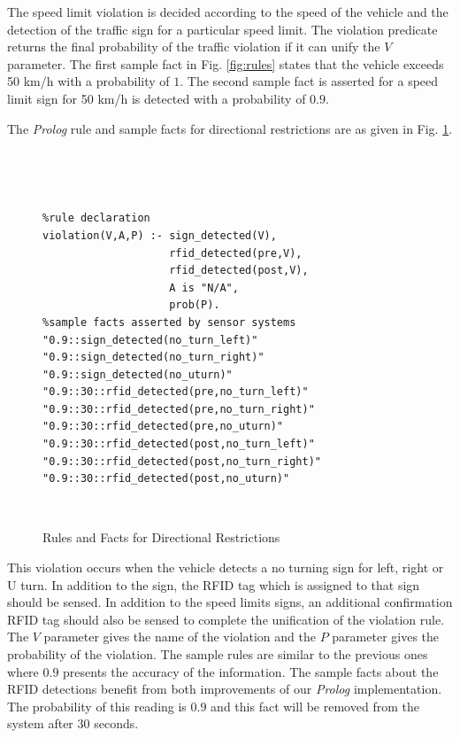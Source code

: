 \documentclass[letterpaper, 10 pt, conference]{ieeeconf}
\newenvironment{mylisting}
{~\par~\begin{list}{}{\setlength{\leftmargin}{1em}}\item\scriptsize\bfseries}
{\end{list}~\par}
\begin{document}
The speed limit violation is decided according to the speed of the vehicle and the detection of the traffic sign for a particular speed limit. The violation predicate returns the final probability of the traffic violation if it can unify the $V$ parameter. The first sample fact in Fig. \ref{fig:rules}  states that the vehicle exceeds 50 km/h with a probability of $1$. The second sample fact is asserted for a speed limit sign for 50 km/h is detected with a probability of $0.9$.

The \textit{Prolog} rule and sample facts for directional restrictions are as given in Fig. \ref{fig:directional}.

\begin{figure}[thb]
      \centering
\begin{mylisting}

\begin{verbatim}
%rule declaration
violation(V,A,P) :- sign_detected(V),
                    rfid_detected(pre,V),
                    rfid_detected(post,V),
                    A is "N/A",
                    prob(P).
%sample facts asserted by sensor systems
"0.9::sign_detected(no_turn_left)"
"0.9::sign_detected(no_turn_right)"
"0.9::sign_detected(no_uturn)"
"0.9::30::rfid_detected(pre,no_turn_left)"
"0.9::30::rfid_detected(pre,no_turn_right)"
"0.9::30::rfid_detected(pre,no_uturn)"
"0.9::30::rfid_detected(post,no_turn_left)"
"0.9::30::rfid_detected(post,no_turn_right)"
"0.9::30::rfid_detected(post,no_uturn)"
\end{verbatim}
\end{mylisting}
      \caption{Rules and Facts for Directional Restrictions}
      \label{fig:directional}
\end{figure}

This violation occurs when the vehicle detects a no turning sign for left, right or U turn. In addition to the sign, the RFID tag which is assigned to that sign should be sensed. In addition to the speed limits signs, an additional confirmation RFID tag should also be sensed to complete the unification of the violation rule. The $V$ parameter gives the name of the violation and the $P$ parameter gives the probability of the violation. The sample rules are similar to the previous ones where $0.9$ presents the accuracy of the information. The sample facts about the RFID detections benefit from both improvements of our \textit{Prolog} implementation. The probability of this reading is $0.9$ and this fact will be removed from the system after $30$ seconds.
\end{document}
